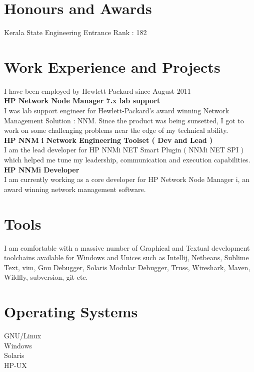 \documentclass[line,margin]{res}
\begin{document}
\begin{resume}
\section{Honours and Awards}
Kerala State Engineering Entrance Rank : 182\\

\section{Work Experience and Projects}

I have been employed by Hewlett-Packard since August 2011\\

{\bf HP Network Node Manager 7.x lab support}\\
I was lab support engineer for Hewlett-Packard's award winning Network Management Solution : NNM. Since the product was being sunsetted, I got to work on some challenging problems near the edge of my technical ability.\\

{\bf HP NNM i Network Engineering Toolset ( Dev and Lead )}\\
I am the lead developer for HP NNMi NET Smart Plugin ( NNMi NET SPI ) which helped me tune my leadership, communication and execution capabilities.\\

{\bf HP NNMi Developer}\\
I am currently working as a core developer for HP Network Node Manager i, an award winning network management software.\\

\section{Tools}
I am comfortable with a massive number of Graphical and Textual development toolchains available for Windows and Unices such as Intellij, Netbeans, Sublime Text, vim, Gnu Debugger, Solaris Modular Debugger, Truss, Wireshark, Maven, Wildfly, subversion, git etc.\\

\section{Operating Systems}
GNU/Linux\\
Windows\\
Solaris\\
HP-UX\\


\end{resume}
\end{document}
